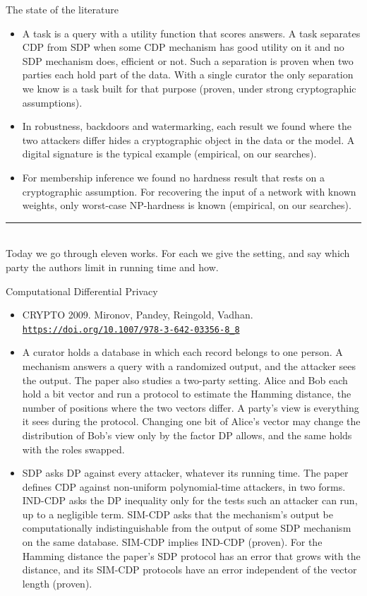 \documentclass[aspectratio=169,10pt]{beamer}
\newcommand{\redline}{\textcolor{kred}{\rule{\textwidth}{1pt}}}
\newcommand{\venue}[3]{\item #1. #2.\\ \href{#3}{\nolinkurl{#3}}}
\begin{document}
\begin{frame}{The state of the literature}
  \begin{itemize}
    \item A task is a query with a utility function that scores answers. A task separates CDP from SDP when some CDP mechanism has good utility on it and no SDP mechanism does, efficient or not. Such a separation is proven when two parties each hold part of the data. With a single curator the only separation we know is a task built for that purpose (proven, under strong cryptographic assumptions).
    \item In robustness, backdoors and watermarking, each result we found where the two attackers differ hides a cryptographic object in the data or the model. A digital signature is the typical example (empirical, on our searches).
    \item For membership inference we found no hardness result that rests on a cryptographic assumption. For recovering the input of a network with known weights, only worst-case NP-hardness is known (empirical, on our searches).
  \end{itemize}
  \vspace{0.2em}
  \redline\\[0.2em]
  {\small Today we go through eleven works. For each we give the setting, and say which party the authors limit in running time and how.}
\end{frame}

\begin{frame}{Computational Differential Privacy}
  \begin{itemize}
    \venue{CRYPTO 2009}{Mironov, Pandey, Reingold, Vadhan}{https://doi.org/10.1007/978-3-642-03356-8_8}
    \item A curator holds a database in which each record belongs to one person. A mechanism answers a query with a randomized output, and the attacker sees the output. The paper also studies a two-party setting. Alice and Bob each hold a bit vector and run a protocol to estimate the Hamming distance, the number of positions where the two vectors differ. A party's view is everything it sees during the protocol. Changing one bit of Alice's vector may change the distribution of Bob's view only by the factor DP allows, and the same holds with the roles swapped.
    \item SDP asks DP against every attacker, whatever its running time. The paper defines CDP against non-uniform polynomial-time attackers, in two forms. IND-CDP asks the DP inequality only for the tests such an attacker can run, up to a negligible term. SIM-CDP asks that the mechanism's output be computationally indistinguishable from the output of some SDP mechanism on the same database. SIM-CDP implies IND-CDP (proven). For the Hamming distance the paper's SDP protocol has an error that grows with the distance, and its SIM-CDP protocols have an error independent of the vector length (proven).
  \end{itemize}
\end{frame}
\end{document}
